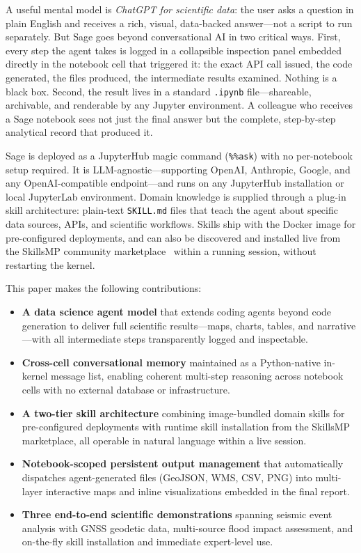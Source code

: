 \documentclass[10pt,twocolumn]{article}
\begin{document}
A useful mental model is \emph{ChatGPT for scientific data}: the user asks a question in
plain English and receives a rich, visual, data-backed answer---not a script to run
separately. But Sage goes beyond conversational AI in two critical ways. First, every
step the agent takes is logged in a collapsible inspection panel embedded directly in the
notebook cell that triggered it: the exact API call issued, the code generated, the files
produced, the intermediate results examined. Nothing is a black box. Second, the result
lives in a standard \texttt{.ipynb} file---shareable, archivable, and renderable by any
Jupyter environment. A colleague who receives a Sage notebook sees not just the final
answer but the complete, step-by-step analytical record that produced it.

Sage is deployed as a JupyterHub magic command (\texttt{\%\%ask}) with no per-notebook
setup required. It is LLM-agnostic---supporting OpenAI, Anthropic, Google, and any
OpenAI-compatible endpoint---and runs on any JupyterHub installation or local JupyterLab
environment. Domain knowledge is supplied through a plug-in skill architecture: plain-text
\texttt{SKILL.md} files that teach the agent about specific data sources, APIs, and
scientific workflows. Skills ship with the Docker image for pre-configured deployments,
and can also be discovered and installed live from the SkillsMP community
marketplace~\cite{skillsmp} within a running session, without restarting the kernel.

This paper makes the following contributions:

\begin{itemize}
  \item \textbf{A data science agent model} that extends coding agents beyond code
        generation to deliver full scientific results---maps, charts, tables, and
        narrative---with all intermediate steps transparently logged and inspectable.

  \item \textbf{Cross-cell conversational memory} maintained as a Python-native in-kernel
        message list, enabling coherent multi-step reasoning across notebook cells with
        no external database or infrastructure.

  \item \textbf{A two-tier skill architecture} combining image-bundled domain skills
        for pre-configured deployments with runtime skill installation from the SkillsMP
        marketplace, all operable in natural language within a live session.

  \item \textbf{Notebook-scoped persistent output management} that automatically
        dispatches agent-generated files (GeoJSON, WMS, CSV, PNG) into multi-layer
        interactive maps and inline visualizations embedded in the final report.

  \item \textbf{Three end-to-end scientific demonstrations} spanning seismic event
        analysis with GNSS geodetic data, multi-source flood impact assessment, and
        on-the-fly skill installation and immediate expert-level use.
\end{itemize}
\end{document}
